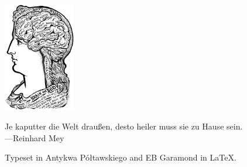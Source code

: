 \documentclass{article}
\renewcommand{\c}[1]{{\textcolor{christmas}{#1}}}
\begin{document}
\vfill\includegraphics[height=4.75cm]{head}

\vfill\begin{minipage}[c]{.8\textwidth}\centering%
    \c{\glqq}Je kaputter die Welt draußen,
    desto heiler muss sie zu Hause sein.\c{\grqq}\\[2mm]
    \c{---}Reinhard Mey
\end{minipage}

\newpage\restoregeometry %
\vfill
{\small Typeset in Antykwa Półtawskiego and EB Garamond in \LaTeX.}
\end{document}
